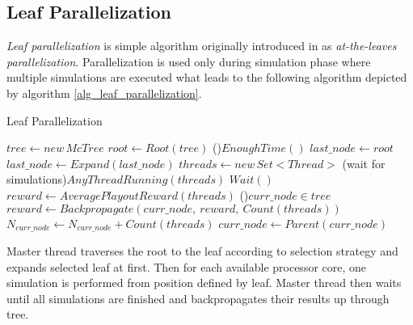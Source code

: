 \subsection{Leaf Parallelization}

\emph{Leaf parallelization} is simple algorithm originally introduced in \cite{Cazenave2007} as
\emph{at-the-leaves parallelization}. Parallelization is used only during simulation phase where
multiple simulations are executed what leads to the following algorithm depicted by algorithm
\ref{alg_leaf_parallelization}.

\begin{algorithm}
\DontPrintSemicolon
\caption{Leaf Parallelization}
\label{alg_leaf_parallelization}
$tree \leftarrow new\,McTree$ \;
$root \leftarrow Root(tree)$\;
\While(){$EnoughTime()$}{
    $last\_node \leftarrow root$ \;
    $last\_node \leftarrow Expand(last\_node)$ \;
    $threads \leftarrow new\,Set<Thread>$ \;
    \While(wait for simulations){$AnyThreadRunning(threads)$}{
        $Wait()$\;
    }
    $reward \leftarrow AveragePlayoutReward(threads)$\;
    \While(){$curr\_node \in tree$}{
        $reward \leftarrow Backpropagate(curr\_node,\:reward,\:Count(threads))$\;
        $N_{curr\_node} \leftarrow N_{curr\_node}+Count(threads)$ \;
        $curr\_node \leftarrow Parent(curr\_node)$\;
    }
}
 \;
\end{algorithm}

Master thread traverses the root to the leaf according to selection strategy and expands selected
leaf at first. Then for each available processor core, one simulation is performed from position
defined by leaf. Master thread then waits until all simulations are finished and backpropagates
their results up through tree.

